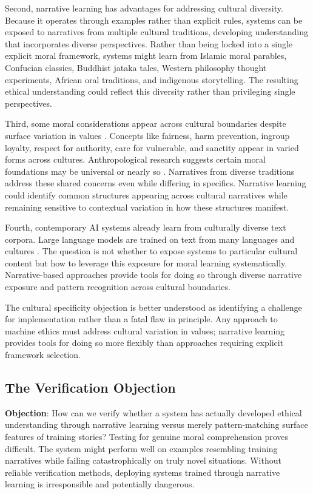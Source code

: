 \documentclass[12pt]{article}
\begin{document}
Second, narrative learning has advantages for addressing cultural diversity. Because it operates through examples rather than explicit rules, systems can be exposed to narratives from multiple cultural traditions, developing understanding that incorporates diverse perspectives. Rather than being locked into a single explicit moral framework, systems might learn from Islamic moral parables, Confucian classics, Buddhist jataka tales, Western philosophy thought experiments, African oral traditions, and indigenous storytelling. The resulting ethical understanding could reflect this diversity rather than privileging single perspectives.

Third, some moral considerations appear across cultural boundaries despite surface variation in values \citep{brown1991human, haidt2012righteous}. Concepts like fairness, harm prevention, ingroup loyalty, respect for authority, care for vulnerable, and sanctity appear in varied forms across cultures. Anthropological research suggests certain moral foundations may be universal or nearly so \citep{turiel1983development}. Narratives from diverse traditions address these shared concerns even while differing in specifics. Narrative learning could identify common structures appearing across cultural narratives while remaining sensitive to contextual variation in how these structures manifest.

Fourth, contemporary AI systems already learn from culturally diverse text corpora. Large language models are trained on text from many languages and cultures \citep{brown2020language}. The question is not whether to expose systems to particular cultural content but how to leverage this exposure for moral learning systematically. Narrative-based approaches provide tools for doing so through diverse narrative exposure and pattern recognition across cultural boundaries.

The cultural specificity objection is better understood as identifying a challenge for implementation rather than a fatal flaw in principle. Any approach to machine ethics must address cultural variation in values; narrative learning provides tools for doing so more flexibly than approaches requiring explicit framework selection.

\subsection{The Verification Objection}

\textbf{Objection}: How can we verify whether a system has actually developed ethical understanding through narrative learning versus merely pattern-matching surface features of training stories? Testing for genuine moral comprehension proves difficult. The system might perform well on examples resembling training narratives while failing catastrophically on truly novel situations. Without reliable verification methods, deploying systems trained through narrative learning is irresponsible and potentially dangerous.
\end{document}
